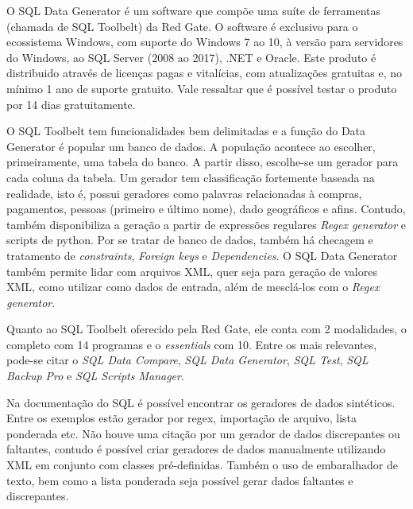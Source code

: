 \documentclass[
	12pt,				%
	openright,			%
	twoside,			%
	a4paper,			%
	english,			%
	brazil				%
	]{abntex2}
\begin{document}
		O SQL Data Generator \cite{RedgateSQLDataGenerator} é um software que compõe uma suíte de ferramentas (chamada de SQL Toolbelt) da Red Gate.
		O software é exclusivo para o ecossistema Windows, com suporte do Windows 7 ao 10, à versão para servidores do Windows, ao SQL Server (2008 ao 2017), .NET e Oracle.
		Este produto é distribuido através de licenças pagas e vitalícias, com atualizações gratuitas e, no mínimo 1 ano de suporte gratuito.
		Vale ressaltar que é possível testar o produto por 14 dias gratuitamente.
		\par
		O SQL Toolbelt tem funcionalidades bem delimitadas e a função do Data Generator é popular um banco de dados. 
		A população acontece ao escolher, primeiramente, uma tabela do banco.
		A partir disso, escolhe-se um gerador para cada coluna da tabela.
		Um gerador tem classificação fortemente baseada na realidade, isto é, possui geradores como palavras relacionadas à compras, pagamentos, pessoas (primeiro e último nome), dado geográficos e afins.
		Contudo, também disponibiliza a geração a partir de expressões regulares \emph{Regex generator} e scripts de python.
		Por se tratar de banco de dados, também há checagem e tratamento de \emph{constraints}, \emph{Foreign keys} e \emph{Dependencies}.
		O SQL Data Generator também permite lidar com arquivos XML, quer seja para geração de valores XML, como utilizar como dados de entrada, além de mesclá-los com o \emph{Regex generator}.
		\par
		Quanto ao SQL Toolbelt oferecido pela Red Gate, ele conta com 2 modalidades, o completo com 14 programas e o \emph{essentials} com 10.
		Entre os mais relevantes, pode-se citar o \emph{SQL Data Compare}, \emph{SQL Data Generator}, \emph{SQL Test}, \emph{SQL Backup Pro} e \emph{SQL Scripts Manager}.
		\par
		Na documentação do SQL \cite{RedgateSQLDataGeneratorDoc} é possível encontrar os geradores de dados sintéticos.
		Entre os exemplos estão gerador por regex, importação de arquivo, lista ponderada etc.
		Não houve uma citação por um gerador de dados discrepantes ou faltantes,
		 contudo é possível criar geradores de dados manualmente utilizando XML em conjunto com classes pré-definidas.
		Também o uso de embaralhador de texto, bem como a lista ponderada seja possível gerar dados faltantes e discrepantes.
\end{document}
